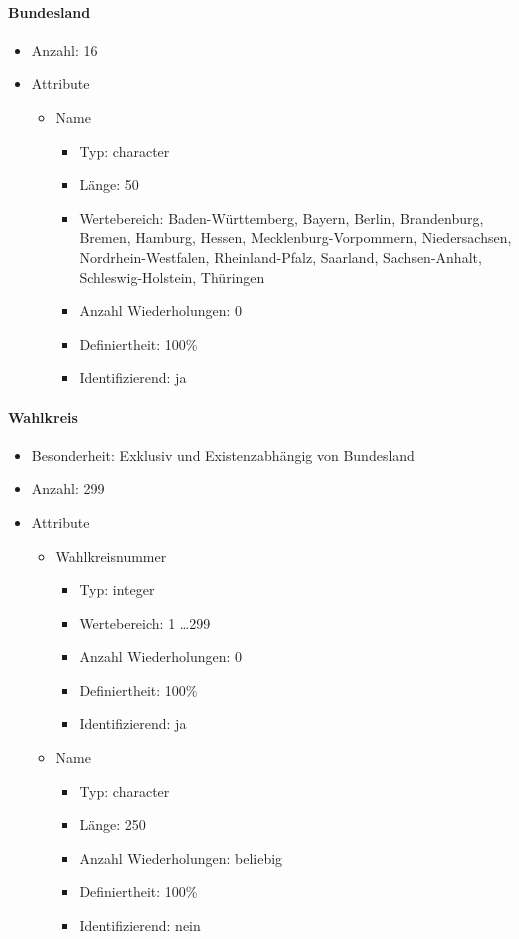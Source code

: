 \documentclass[a4paper]{article}
\begin{document}
\paragraph{Bundesland}
\begin{itemize}
\item Anzahl: 16
\item Attribute
	\begin{itemize}
	\item Name
	\begin{itemize}
		\item Typ: character
		\item Länge: 50
		\item Wertebereich: Baden-Württemberg, Bayern, Berlin, Brandenburg, Bremen, Hamburg, Hessen, Mecklenburg-Vorpommern, Niedersachsen, Nordrhein-Westfalen, Rheinland-Pfalz, Saarland, Sachsen-Anhalt, Schleswig-Holstein, Thüringen
		\item Anzahl Wiederholungen: 0
		\item Definiertheit: 100\%
		\item Identifizierend: ja
		\end{itemize}
	\end{itemize}
\end{itemize}

\paragraph{Wahlkreis}
\begin{itemize}
\item Besonderheit: Exklusiv und Existenzabhängig von Bundesland
\item Anzahl: 299
\item Attribute
	\begin{itemize}
	\item Wahlkreisnummer
		\begin{itemize}
		\item Typ: integer
		\item Wertebereich: 1 \ldots 299
		\item Anzahl Wiederholungen: 0
		\item Definiertheit: 100\%
		\item Identifizierend: ja
		\end{itemize}
	\item Name
		\begin{itemize}
		\item Typ: character
		\item Länge: 250
		\item Anzahl Wiederholungen: beliebig
		\item Definiertheit: 100\%
		\item Identifizierend: nein
		\end{itemize}
	\end{itemize}
\end{itemize}
\end{document}
